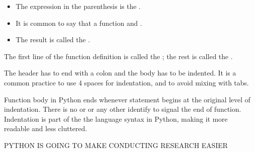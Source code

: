 \documentclass[letterpaper,10pt,english]{sphinxmanual}
\begin{document}
\begin{sphinxVerbatim}[commandchars=\\\{\}]
 
     
\end{sphinxVerbatim}
\begin{itemize}
\item {} 
The expression in the parenthesis is the .

\item {} 
It is common to say that a function  and .

\item {} 
The result is called the .

\end{itemize}

The first line of the function definition is called the ; the rest is called the .

The header has to end with a colon and the body has to be indented.
It is a common practice to use 4 spaces for indentation, and to avoid mixing with tabs.

Function body in Python ends whenever statement begins at the original level of indentation.  There is no  or  or any other identify to signal the end of function.  Indentation is part of the the language syntax in Python, making it more readable and less cluttered.

\begin{sphinxVerbatim}[commandchars=\\\{\}]
 
     

  

\end{sphinxVerbatim}

\begin{sphinxVerbatim}[commandchars=\\\{\}]
PYTHON IS GOING TO MAKE CONDUCTING RESEARCH EASIER
\end{sphinxVerbatim}
\end{document}
